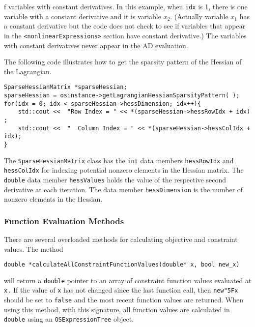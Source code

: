 \documentclass[11pt]{article}
\renewcommand{\_}{{\char"5F}}
\renewcommand{\{}{{\char"7B}}
\renewcommand{\}}{{\char"7D}}
\renewcommand{\^}{{\char"0D}}
\renewcommand{\'}{{\char"0D}}
\begin{document}
 f  variables with constant derivatives. In this example, when {\tt idx} is 1, there is one  variable with a constant derivative and it is variable $x_{2}.$  (Actually variable $x_{1}$ has a constant derivative but the code does not check to see if variables that appear in the {\tt <nonlinearExpressions>} section have constant derivative.) The  variables with constant derivatives never appear in the AD evaluation.

The following code illustrates how to get the sparsity pattern of the Hessian of the Lagrangian.
\begin{verbatim}
SparseHessianMatrix *sparseHessian;
sparseHessian = osinstance->getLagrangianHessianSparsityPattern( );
for(idx = 0; idx < sparseHessian->hessDimension; idx++){
	std::cout <<  "Row Index = " << *(sparseHessian->hessRowIdx + idx) ;
	std::cout <<  "  Column Index = " << *(sparseHessian->hessColIdx + idx);
}
\end{verbatim}
The {\tt SparseHessianMatrix} class has the {\tt int} data members {\tt hessRowIdx} and {\tt hessColIdx} for indexing  potential nonzero elements in the Hessian matrix. The {\tt double} data member {\tt hessValues} holds the value of the respective second derivative at each iteration.   The data member {\tt hessDimension} is the number of nonzero elements in the Hessian. 


\subsubsection{Function Evaluation Methods}

There are several overloaded methods for calculating objective and constraint values.  The method
\begin{verbatim}
double *calculateAllConstraintFunctionValues(double* x, bool new_x)
\end{verbatim}
will return a {\tt double} pointer to an array of constraint function values evaluated at {\tt x.}  If the value of {\tt x} has not changed since the last function call, then {\tt new\_x} should be set to {\tt false} and the most recent function values are returned.  When using this method, with this signature,  all function values are calculated in {\tt double} using an {\tt OSExpressionTree} object.
\end{document}
